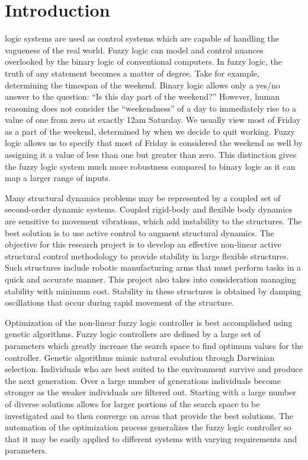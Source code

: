 \documentclass[submit]{aiaa-tc}%
\begin{document}
\section{Introduction}\label{s:intro}
 logic systems are used as control systems which are capable of handling the vagueness of the real world. Fuzzy logic can model and control nuances overlooked by the binary logic of conventional computers.\cite{kosko:91bk} In fuzzy logic, the truth of any statement becomes a matter of degree. Take for example, determining the timespan of the weekend.\cite{matlab:12tb} Binary logic allows only a yes/no answer to the question: ``Is this day part of the weekend?'' However, human reasoning does not consider the ``weekendness'' of a day to immediately rise to a value of one from zero at exactly 12am Saturday. We usually view most of Friday as a part of the weekend, determined by when we decide to quit working. Fuzzy logic allows us to specify that most of Friday is considered the weekend as well by assigning it a value of less than one but greater than zero. This distinction gives the fuzzy logic system much more robustness compared to binary logic as it can map a larger range of inputs.
	
Many structural dynamics problems may be represented by a coupled set of second-order dynamic systems\cite{cohen:01jgcd}. Coupled rigid-body and flexible body dynamics are sensitive to movement vibrations, which add instability to the structures. The best solution is to use active control to augment structural dynamics.
The objective for this research project is to develop an effective non-linear active structural control methodology to provide stability in large flexible structures. Such structures include robotic manufacturing arms that must perform tasks in a quick and accurate manner. This project also takes into consideration managing stability with minimum cost. Stability in these structures is obtained by damping oscillations that occur during rapid movement of the structure.

Optimization of the non-linear fuzzy logic controller is best accomplished using genetic algorithms. Fuzzy logic controllers are defined by a large set of parameters which greatly increase the search space to find optimum values for the controller. Genetic algorithms mimic natural evolution through Darwinian selection\cite{cordon:01bk}. Individuals who are best suited to the environment survive and produce the next generation. Over a large number of generations individuals become stronger as the weaker individuals are filtered out. Starting with a large number of diverse solutions allows for larger portions of the search space to be investigated and to then converge on areas that provide the best solutions. The automation of the optimization process generalizes the fuzzy logic controller so that it may be easily applied to different systems with varying requirements and parameters.
\end{document}
